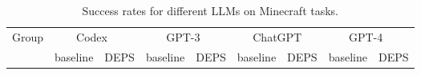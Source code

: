 \begin{table}[H]
\centering
\caption{Success rates for different LLMs on Minecraft tasks.}
\label{tab:ablation_on_llm}
\renewcommand\arraystretch{1.3}
\begin{adjustbox}{width=0.7\textwidth}
\begin{tabular}{@{}c|cc|cc|cc|cc@{}}
\hline
\multirow{2}{*}{Group} & \multicolumn{2}{c|}{Codex~\cite{codex}} & \multicolumn{2}{c|}{GPT-3~\cite{gpt3}} & \multicolumn{2}{c|}{ChatGPT} & \multicolumn{2}{c}{GPT-4~\cite{gpt4}} \\
\cline{2-3} \cline{4-5} \cline{6-7} \cline{8-9}
& baseline & DEPS & baseline & DEPS & baseline & DEPS & baseline & DEPS \\

\end{tabular}
\end{adjustbox}
\end{table}
